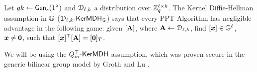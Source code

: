\begin{definition} Let  ${gk} 
\gets\mathsf{Gen}_s(1^\lambda)$ and $\mathcal{D}_{\ell,k}$ a distribution over $\mathbb{Z}_q^{\ell\times k}$.
The Kernel Diffie-Hellman assumption in $\mathbb{G}$ ($\mathcal{D}_{\ell,k}\mbox{-}\mathsf{KerMDH}_{\mathbb{G}}$) says that every PPT Algorithm has negligible advantage in the following  game: given $[\mathbf{{A}}]$, where $\mathbf{{A}} \gets \mathcal{D}_{\ell,k}$, find $[{\boldsymbol{x}}] \in \mathbb{G}^{\ell}$, ${\boldsymbol{x}} \neq {\boldsymbol{0}}$, such that 
$[{\boldsymbol{x}}]^{\top}[\mathbf{{A}}]=[{\boldsymbol{0}}]_T$. 
\end{definition}

We will be using the $Q_m^\top\mbox{-}\mathsf{KerMDH}$ assumption, which was proven secure in the generic bilinear group model by Groth and Lu \cite{AC:GroLu07}.